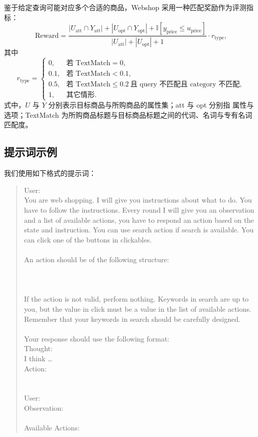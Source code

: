 鉴于给定查询可能对应多个合适的商品，Webshop 采用一种匹配奖励作为评测指标：
\begin{equation}\label{eq:webshop-reward}
    \text{Reward} = \frac{|U_{\text{att}} \cap Y_{\text{att}}| + |U_{\text{opt}} \cap Y_{\text{opt}}| + \mathbb{I}[y_{\text{price}} \le u_{\text{price}}]}
                          {|U_{\text{att}}| + |U_{\text{opt}}| + 1}
                  \cdot r_{\text{type}},
\end{equation}
其中
\begin{equation}\label{eq:webshop-rtype}
    r_{\text{type}} = \begin{cases}
        0,   & \text{若 TextMatch} = 0, \\
        0.1, & \text{若 TextMatch} < 0.1, \\
        0.5, & \text{若 TextMatch} \le 0.2\ \text{且 query 不匹配且 category 不匹配}, \\
        1,   & \text{其它情形}.
    \end{cases}
\end{equation}
式中，$U$ 与 $Y$ 分别表示目标商品与所购商品的属性集；att 与 opt 分别指
属性与选项；TextMatch 为所购商品标题与目标商品标题之间的代词、名词与专有名词
匹配度。

\subsection{提示词示例}

我们使用如下格式的提示词：
\begin{quote}\small\ttfamily
User:\\
You are web shopping. I will give you instructions about what to do.
You have to follow the instructions. Every round I will give you an
observation and a list of available actions, you have to respond an
action based on the state and instruction. You can use search action if
search is available. You can click one of the buttons in clickables.\\
\\
An action should be of the following structure:\\
\\
\\
\\
If the action is not valid, perform nothing. Keywords in search are up
to you, but the value in click must be a value in the list of available
actions. Remember that your keywords in search should be carefully
designed.\\
\\
Your response should use the following format:\\
Thought:\\
I think \dots\\
Action:\\
\\
\\
User:\\
Observation: \\
\\
Available Actions: \\
\end{quote}

